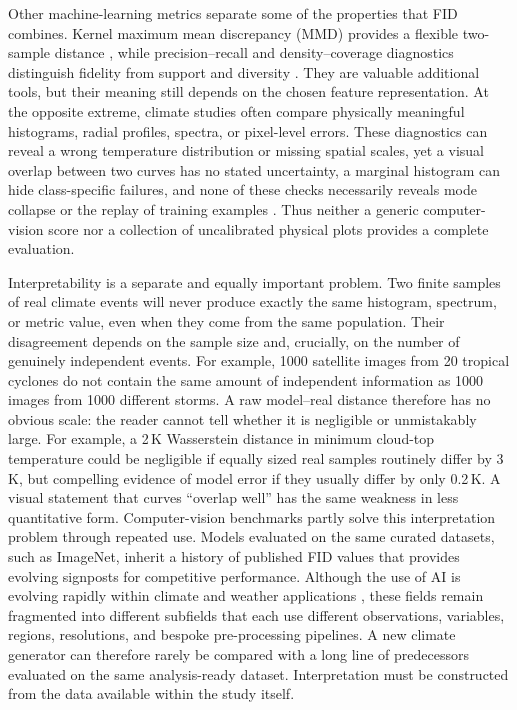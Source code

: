 \documentclass[gmd, manuscript]{copernicus}
\begin{document}
Other machine-learning metrics separate some of the properties that FID combines.
Kernel maximum mean discrepancy (MMD) provides a flexible two-sample distance
\citep{Gretton2012}, while precision--recall and density--coverage diagnostics
distinguish fidelity from support and diversity
\citep{Kynkaanniemi2019,Naeem2020}. They are valuable additional tools, but their
meaning still depends on the chosen feature representation. At the opposite extreme,
climate studies often compare physically meaningful histograms, radial profiles,
spectra, or pixel-level errors. These diagnostics can reveal a wrong temperature
distribution or missing spatial scales, yet a visual overlap between two curves has
no stated uncertainty, a marginal histogram can hide class-specific failures, and
none of these checks necessarily reveals mode collapse or the replay of training
examples \citep{Somepalli2023,Carlini2023}. Thus neither a generic computer-vision
score nor a collection of uncalibrated physical plots provides a complete evaluation.

Interpretability is a separate and equally important problem. Two finite samples of
real climate events will never produce exactly the same histogram, spectrum, or metric
value, even when they come from the same population. Their disagreement depends on the
sample size and, crucially, on the number of genuinely independent events. For
example, 1000 satellite images from 20 tropical cyclones do not contain the same
amount of independent information as 1000 images from 1000 different storms. A raw
model--real distance therefore has no obvious scale: the reader cannot tell whether it is negligible or unmistakably large. For example, a 2\,K Wasserstein
distance in minimum cloud-top temperature could be negligible if equally sized real
samples routinely differ by 3\,K, but compelling evidence of model error if they
usually differ by only 0.2\,K. A visual statement that curves ``overlap well'' has the
same weakness in less quantitative form. Computer-vision benchmarks partly solve this interpretation problem through repeated
use. Models evaluated on the same curated datasets, such as ImageNet, inherit a
history of published FID values that provides evolving signposts for competitive
performance. Although the use of AI is evolving rapidly within climate and weather applications  \citep{Ascenso2026}, these fields remain fragmented into different subfields that each use
different observations, variables, regions, resolutions, and bespoke pre-processing
pipelines. A new climate generator can therefore rarely be compared with a long line
of predecessors evaluated on the same analysis-ready dataset. Interpretation must be constructed from the data available within the study itself.
\end{document}

